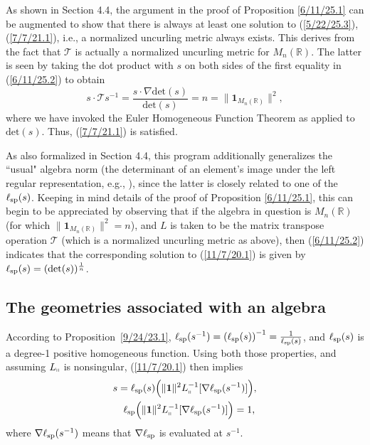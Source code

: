 \documentclass{amsart}
\theoremstyle{definition}
\numberwithin{theorem}{section}
\numberwithin{equation}{section}
\begin{document}
As shown in Section 4.4, the argument in the proof of Proposition \ref{6/11/25.1} can be augmented to show that there is always at least one solution to (\ref{5/22/25.3}), (\ref{7/7/21.1}), i.e.,  a normalized uncurling metric always exists.  This derives from the fact that $\mathcal{T}$ is actually a normalized uncurling metric for $M_n(\mathbb{R})$.  The latter is seen by taking the dot product with $s$ on both sides of the first equality in (\ref{6/11/25.2}) to obtain
\begin{equation}\label{9/15/25.1}s\cdot\mathcal{T}s^{-1} = \frac{s\cdot\nabla\text{det}(s)}{\text{det}(s)} = n = \|\mathbf{1}_{M_n(\mathbb{R})}\|^2,\end{equation} 
where we have invoked the Euler Homogeneous Function Theorem as applied to $\text{det}(s)$.    Thus, (\ref{7/7/21.1}) is satisfied.   

As also formalized in Section 4.4, this program additionally generalizes the ``usual" algebra norm (the determinant of an element's image under the left regular representation, e.g., \cite{bourbaki:1989}), since the latter is closely related to one of the $\ell_{\rm sp}(s)$. Keeping in mind details of the proof of Proposition \ref{6/11/25.1},  this can begin to be appreciated by observing that if the algebra in question is $M_n(\mathbb{R})$ (for which $\|\mathbf{1}_{M_n(\mathbb{R})}\|^2=n$), and $L$ is taken to be the matrix transpose operation $\mathcal{T}$ (which is a normalized uncurling metric as above), then (\ref{6/11/25.2}) indicates that the corresponding solution to (\ref{11/7/20.1}) is given by $\ell_{\rm sp}(s) = (\text{det}(s))^\frac{1}{n}$. 

\subsection{The geometries associated with an algebra}
According to \mbox{Proposition \ref{9/24/23.1}}, $\ell_{\rm sp}(s^{-1}) = \left(\ell_{\rm sp}(s)\right)^{-1} = \frac{1}{\ell_{\rm sp}(s)}$, and $\ell_{\rm sp}(s)$ is a degree-1 positive homogeneous function.  Using both those properties, and assuming  $L_{\shortparallel}$ is nonsingular, (\ref{11/7/20.1}) then implies
   \begin{eqnarray}\label{5/22/24.5}  s = \ell_{\rm sp}(s)\Big(\|\mathbf{1}\|^2 L_{\shortparallel}^{-1}[\nabla\ell_{\rm sp}(s^{-1})]\Big),\\
\label{5/22/24.6}\ell_{\rm sp}\Big(\|\mathbf{1}\|^2 L_{\shortparallel}^{-1}[\nabla\ell_{\rm sp}(s^{-1})]\Big) = 1,\,\end{eqnarray}
where $\nabla\ell_{\rm sp}(s^{-1})$ means that $\nabla\ell_{\rm sp}$ is evaluated at $s^{-1}$.  
\end{document}
